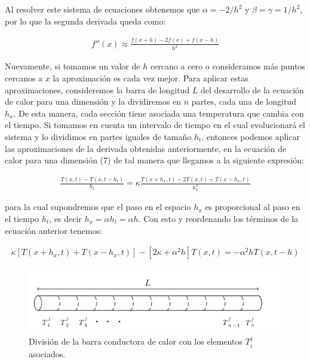 \documentclass[12pt]{article}
\begin{document}
Al resolver este sistema de ecuaciones obtenemos que $\alpha = -2/h^2$ y $\beta = \gamma = 1/h^2$, por lo que la segunda derivada queda como:

\begin{align*}
    f''(x) \approx \frac{f(x+h) - 2f(x) + f(x-h)}{h^2}
\end{align*}

Nuevamente, si tomamos un valor de $h$ cercano a cero o consideramos más puntos cercanos a $x$ la aproximación es cada vez mejor. Para aplicar estas aproximaciones, consideremos la barra de longitud $L$ del desarrollo de la ecuación de calor para una dimensión y la dividiremos en $n$ partes, cada una de longitud $h_x$. De esta manera, cada sección tiene asociada una temperatura que cambia con el tiempo. Si tomamos en cuenta un intervalo de tiempo en el cual evolucionará el sistema y lo dividimos en partes iguales de tamaño $h_t$, entonces podemos aplicar las aproximaciones de la derivada obtenidas anteriormente, en la ecuación de calor para una dimensión (7) de tal manera que llegamos a la siguiente expresión:

\begin{align*}
    \frac{T(x,t)-T(x,t-h_t)}{h_t} = \kappa \frac{T(x+h_x,t) - 2T(x,t) + T(x-h_x,t)}{h_x^2}
\end{align*}

para la cual supondremos que el paso en el espacio $h_x$ es proporcional al paso en el tiempo $h_t$, es decir $h_x = \alpha h_t = \alpha h$. Con esto y reordenando los términos de la ecuación anterior tenemos:

\begin{align*}
    \kappa[T(x+h_x,t) + T(x-h_x,t)] - [2\kappa + \alpha^2 h]T(x,t) = -\alpha^2 h T(x,t-h)
\end{align*}

\begin{figure}[H]
\begin{center}
    \includegraphics[width=1\linewidth]{Division.png}
    \caption{División de la barra conductora de calor con los elementos $T_i^j$ asociados.}
\end{center}
\end{figure}
\end{document}
